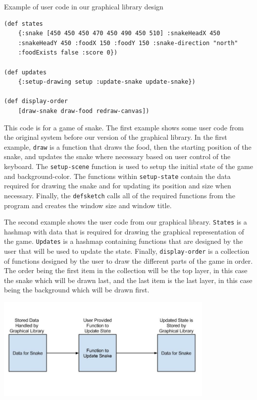 \documentclass[12pt]{article}
\begin{document}
Example of user code in our graphical library design
\begin{verbatim}
(def states 
	{:snake [450 450 450 470 450 490 450 510] :snakeHeadX 450 
	:snakeHeadY 450 :foodX 150 :foodY 150 :snake-direction "north" 
	:foodExists false :score 0})
	
(def updates
	{:setup-drawing setup :update-snake update-snake})
	
(def display-order
	[draw-snake draw-food redraw-canvas])
\end{verbatim}
This code is for a game of snake. The first example shows some user code from the original system before our version of the graphical library. In the first example, \texttt{draw} is a function that draws the food, then the starting position of the snake, and updates the snake where necessary based on user control of the keyboard.  The \texttt{setup-scene} function is used to setup the initial state of the game and background-color. The functions within \texttt{setup-state} contain the data required for drawing the snake and for updating its position and size when necessary. Finally, the \texttt{defsketch} calls all of the required functions from the program and creates the window size and window title. 

The second example shows the user code from our graphical library. \texttt{States} is a hashmap with data that is required for drawing the graphical representation of the game. \texttt{Updates} is a hashmap containing functions that are designed by the user that will be used to update the state. Finally, \texttt{display-order} is a collection of functions designed by the user to draw the different parts of the game in order. The order being the first item in the collection will be the top layer, in this case the snake which will be drawn last, and the last item is the last layer, in this case being the background which will be drawn first.

\begin{center}
\includegraphics[width=300pt]{Handling_State_in_Graphical_Library}
\end{center}
 
\end{document}

